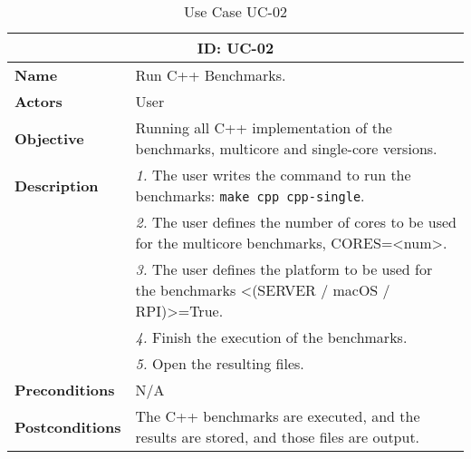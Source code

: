 \begin{table}[H]
    \centering
    \begin{tabular}{l p{10cm}}
        \toprule
        \multicolumn{2}{c}{\textbf{ID: UC-02}} \\
        \toprule
        \textbf{Name}                         &  Run C++ Benchmarks. \\
        \textbf{Actors}                       &  User \\
        \textbf{Objective}                    &  Running all C++ implementation of the benchmarks, multicore and single-core versions. \\
        \multirow{1}{*}{\textbf{Description}} & \textsl{1.} The user writes the command to run the benchmarks: \texttt{make cpp cpp-single}.\\
                                              & \textsl{2.} The user defines the number of cores to be used for the multicore benchmarks, CORES=<num>.\\
                                              & \textsl{3.} The user defines the platform to be used for the benchmarks <(SERVER / macOS / RPI)>=True.\\
                                              & \textsl{4.} Finish the execution of the benchmarks.\\
                                              & \textsl{5.} Open the resulting files.\\ 
        \textbf{Preconditions}                &  N/A \\
        \textbf{Postconditions}               &  The C++ benchmarks are executed, and the results are stored, and those files are output. \\
    \end{tabular}
    \caption{Use Case UC-02}
    \label{tab:uc-single-core 02}
\end{table}


